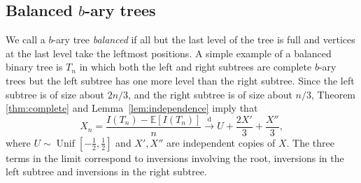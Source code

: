 \documentclass[11pt]{article}
\newcommand{\E}[1]{\mathbb{E} \left[#1\right]}
\def\n{\nu}
\newcommand{\dep}{d}
\numberwithin{theorem}{section}
\newcommand{\bfrac}[2]{\left({\frac{#1}{#2}}\right)}
\theoremstyle{definition}
\newcommand{\floor}[1]{\lfloor #1 \rfloor}
\newcommand{\inlaw}{\dto}%
\newcommand{\Unif}{\mathop{\mathrm{Unif}}}
\numberwithin{equation}{section}
\newcommand{\refL}[1]{Lemma~\ref{#1}}
\newcommand{\too}{\longrightarrow}
\newcommand\dto{\overset{\mathrm{d}}{\too}}
\begin{document}
%


\subsection{Balanced \texorpdfstring{\(b\)}{b}-ary trees}

We call a \(b\)-ary tree {\em balanced} if all but the last level of the tree is full and vertices at
the last level take the leftmost positions.  A simple example of a
balanced binary tree is \(T_n\)
in which both the left and right subtrees are complete \(b\)-ary trees but the left subtree has one more level
than the right subtree.  Since the left subtree is of size about \(2n/3\), and the right subtree is of
size about \(n/3\), Theorem \ref{thm:complete} 
and \refL{lem:independence}
imply that
\[
    X_n = \frac{I(T_n)-\E{I(T_n)}}{n}
    \inlaw U + \frac{2 X'}{3} + \frac{X''}{3},
\]
where \(U \sim \Unif[-\frac{1}{2},\frac{1}{2}]\) and \(X', X''\) are independent copies of
\(X\). The three terms in the limit correspond to inversions involving the root, inversions in
the left subtree and inversions in the right subtree.
\end{document}
